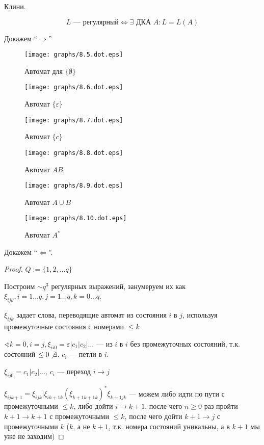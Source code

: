 \begin{theorem}
    Клини.

    $$L \text{ --- регулярный} \Leftrightarrow \exists \text{ ДКА } A : L = L(A)$$
\end{theorem}
Докажем ``$\Rightarrow$''
\begin{figure}[h]
    \centering
    \begin{minipage}{.3\textwidth}
        \centering
        \texttt{[image: graphs/8.5.dot.eps]}
        \caption{Автомат для $\{\emptyset\}$}
    \end{minipage}%
    \begin{minipage}{.3\textwidth}
        \centering
        \texttt{[image: graphs/8.6.dot.eps]}
        \caption{Автомат $\{\varepsilon\}$}
    \end{minipage}
    \begin{minipage}{.3\textwidth}
        \centering
        \texttt{[image: graphs/8.7.dot.eps]}
        \caption{Автомат $\{c\}$}
    \end{minipage}
    \begin{minipage}{.5\textwidth}
        \centering
        \texttt{[image: graphs/8.8.dot.eps]}
        \caption{Автомат $AB$}
    \end{minipage}%
    \begin{minipage}{.5\textwidth}
        \centering
        \texttt{[image: graphs/8.9.dot.eps]}
        \caption{Автомат $A\cup B$}
    \end{minipage}
    \begin{minipage}{.5\textwidth}
        \centering
        \texttt{[image: graphs/8.10.dot.eps]}
        \caption{Автомат $A^*$}
    \end{minipage}
\end{figure}

Докажем ``$\Leftarrow$''.
\begin{proof}
    $Q:=\{1,2,\ldots q\}$

    Построим $\sim q^3$ регулярных выражений, занумеруем их как $\xi_{ijk}, i=1\ldots q, j=1\ldots q, k = 0\ldots q$.

    $\xi_{ijk}$ задает слова, переводящие автомат из состояния $i$ в $j$, используя промежуточные состояния с номерами $\leq k$

    $\sphericalangle k=0, i=j, \xi_{ii0}=\varepsilon|c_1|c_2|\ldots$ --- из $i$ в $i$ без промежуточных состояний, т.к. состояний $\leq 0 \not\exists$. $c_i$ --- петли в $i$.

    $\xi_{ij0}=c_1|c_2|\ldots$, $c_i$ --- переход $i\to j$

    $\xi_{ijk+1}=\xi_{ijk}|\xi_{ik+1k}(\xi_{k+1k+1k})^*\xi_{k+1jk}$ --- можем либо идти по пути с промежуточными $\leq k$, либо дойти $i\to k+1$, после чего $n\geq 0$ раз пройти $k+1\to k+1$ с промежуточными $\leq k$, после чего дойти $k+1\to j$  с промежуточными $k$ ($k$, а не $k+1$, т.к. номера состояний уникальны, а в $k+1$ мы уже не заходим)
\end{proof}

